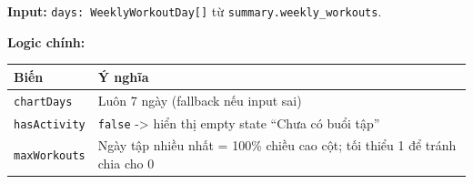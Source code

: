 \documentclass[12pt,a4paper]{article}
\newcounter{none}
\newenvironment{Shaded}{%
  \VerbatimEnvironment
  \begin{quote}\small\ttfamily
}{%
  \end{quote}%
}
\begin{document}
\textbf{Input:} \texttt{days:\ WeeklyWorkoutDay{[}{]}} từ
\texttt{summary.weekly\_workouts}.

\textbf{Logic chính:}

\begin{Shaded}
\begin{Highlighting}[]
\OperatorTok{=} \NormalTok{(}
\NormalTok{  () }\KeywordTok{=\textgreater{}} \OperatorTok{===}  \OperatorTok{:} \NormalTok{())}\OperatorTok{,}
\NormalTok{  [days]}\OperatorTok{,}
\NormalTok{)}\OperatorTok{;}
\OperatorTok{=}\OperatorTok{,}\KeywordTok{=\textgreater{}}\OperatorTok{+}\OperatorTok{,} \NormalTok{)}\OperatorTok{;}
\OperatorTok{=}\OperatorTok{\textgreater{}} \OperatorTok{;}
\OperatorTok{=} \NormalTok{(}\KeywordTok{=\textgreater{}}\NormalTok{)}\OperatorTok{,} \NormalTok{)}\OperatorTok{;}

\end{Highlighting}
\end{Shaded}

{\def\LTcaptype{none} %
\begin{longtable}[]{@{}
  >{\raggedright\arraybackslash}p{}
  >{\raggedright\arraybackslash}p{}@{}}
\toprule\noalign{}
\begin{minipage}[b]{\linewidth}\raggedright
Biến
\end{minipage} & \begin{minipage}[b]{\linewidth}\raggedright
Ý nghĩa
\end{minipage} \\
\midrule\noalign{}
\endhead
\bottomrule\noalign{}
\endlastfoot
\texttt{chartDays} & Luôn 7 ngày (fallback nếu input sai) \\
\texttt{hasActivity} & \texttt{false} -\textgreater{} hiển thị empty
state ``Chưa có buổi tập'' \\
\texttt{maxWorkouts} & Ngày tập nhiều nhất = 100\% chiều cao cột; tối
thiểu 1 để tránh chia cho 0 \\
\end{longtable}
}
\end{document}

